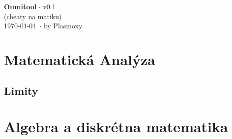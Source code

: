 \documentclass[10pt,a4paper]{article}
\begin{document}
	\begin{center}
		\Large{\textbf{Omnitool} $\cdot$ v0.1}\\
		(cheaty na matiku)\\
		\today\ $\cdot$ by Plasmoxy
	\end{center}

	\section{Matematická Analýza}
	
	\subsection{Limity}
	\blindtext[1]
	
	\begin{multicols}{2}
		\blindtext
		\columnbreak
		\blindtext
	\end{multicols}
	
	\section{Algebra a diskrétna matematika}
	\blindtext[60]
\end{document}
